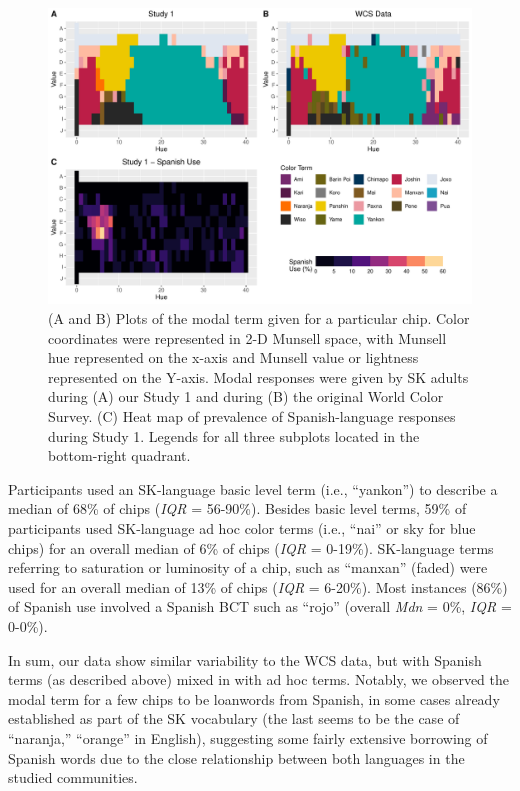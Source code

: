 \documentclass[
  english,
  ,apa7,floatsintext]{apa6}
\begin{document}
\begin{figure}
\centering
\includegraphics{amazon_color_files/figure-latex/study1-figure-1.pdf}
\caption{\label{fig:study1-figure}(A and B) Plots of the modal term given for a particular chip. Color coordinates were represented in 2-D Munsell space, with Munsell hue represented on the x-axis and Munsell value or lightness represented on the Y-axis. Modal responses were given by SK adults during (A) our Study 1 and during (B) the original World Color Survey. (C) Heat map of prevalence of Spanish-language responses during Study 1. Legends for all three subplots located in the bottom-right quadrant.}
\end{figure}

Participants used an SK-language basic level term (i.e., ``yankon'') to describe a median of 68\% of chips (\emph{IQR} = 56-90\%). Besides basic level terms, 59\% of participants used SK-language ad hoc color terms (i.e., ``nai'' or sky for blue chips) for an overall median of 6\% of chips (\emph{IQR} = 0-19\%). SK-language terms referring to saturation or luminosity of a chip, such as ``manxan'' (faded) were used for an overall median of 13\% of chips (\emph{IQR} = 6-20\%). Most instances (86\%) of Spanish use involved a Spanish BCT such as ``rojo'' (overall \emph{Mdn} = 0\%, \emph{IQR} = 0-0\%).

In sum, our data show similar variability to the WCS data, but with Spanish terms (as described above) mixed in with ad hoc terms. Notably, we observed the modal term for a few chips to be loanwords from Spanish, in some cases already established as part of the SK vocabulary (the last seems to be the case of ``naranja,'' ``orange'' in English), suggesting some fairly extensive borrowing of Spanish words due to the close relationship between both languages in the studied communities.
\end{document}
